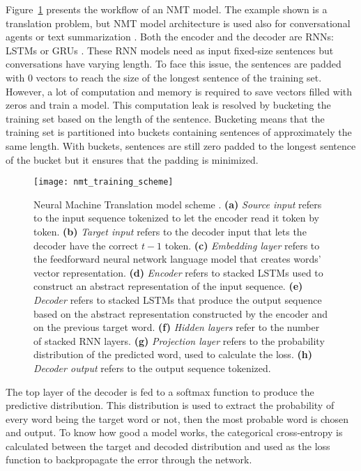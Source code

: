 Figure~\ref{fig:nmt} presents the workflow of an NMT model. The example shown is a translation problem, but NMT model architecture is used also for conversational agents or text summarization \citep{tensorflow.nmt}.
Both the encoder and the decoder are RNNs: LSTMs \citep{1409.3215,1508.04025} or GRUs \citep{1706.05125,1503.02364}. These RNN models need as input fixed-size sentences but conversations have varying length. To face this issue, the sentences are padded with $0$ vectors to reach the size of the longest sentence of the training set. However, a lot of computation and memory is required to save vectors filled with zeros and train a model. This computation leak is resolved by bucketing the training set based on the length of the sentence.
Bucketing means that the training set is partitioned into buckets containing sentences of approximately the same length. With buckets, sentences are still zero padded to the longest sentence of the bucket but it ensures that the padding is minimized.


\begin{figure}
    \centering
    \texttt{[image: nmt\_training\_scheme]}
    \decoRule
    \caption[Neural Machine Translation model scheme]{Neural Machine Translation model scheme \citep{tensorflow.nmt}. \textbf{(a)} \textit{Source input} refers to the input sequence tokenized to let the encoder read it token by token. \textbf{(b)} \textit{Target input} refers to the decoder input that lets the decoder have the correct $t-1$ token. \textbf{(c)} \textit{Embedding layer} refers to the feedforward neural network language model that creates words' vector representation. \textbf{(d)} \textit{Encoder} refers to stacked LSTMs used to construct an abstract representation of the input sequence. \textbf{(e)} \textit{Decoder} refers to stacked LSTMs that produce the output sequence based on the abstract representation constructed by the encoder and on the previous target word. \textbf{(f)} \textit{Hidden layers} refer to the number of stacked RNN layers. \textbf{(g)} \textit{Projection layer} refers to the probability distribution of the predicted word, used to calculate the loss. \textbf{(h)} \textit{Decoder output} refers to the output sequence tokenized.}
    \label{fig:nmt}
\end{figure}

The top layer of the decoder is fed to a softmax function to produce the predictive distribution. This distribution is used to extract the probability of every word being the target word or not, then the most probable word is chosen and output. To know how good a model works, the categorical cross-entropy is calculated between the target and decoded distribution and used as the loss function to backpropagate the error through the network.

